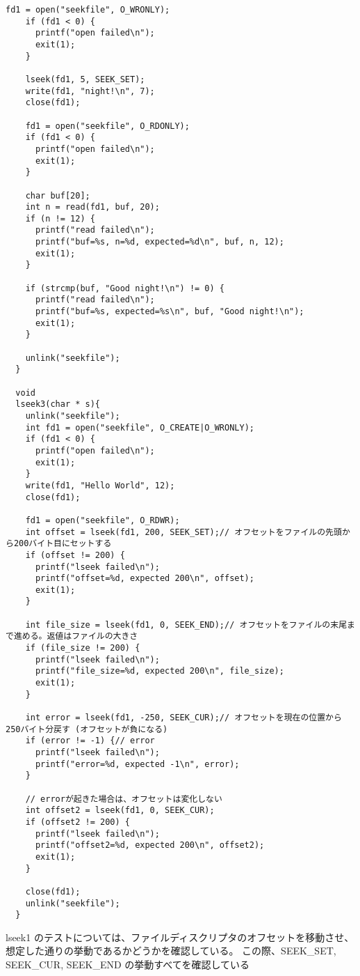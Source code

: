 \documentclass[platex,dvipdfmx, titlepage]{jlreq} %
\begin{document}
\begin{lstlisting}[caption={user/usertests.c}]
    fd1 = open("seekfile", O_WRONLY);
    if (fd1 < 0) {
      printf("open failed\n");
      exit(1);
    }
  
    lseek(fd1, 5, SEEK_SET);
    write(fd1, "night!\n", 7);
    close(fd1);
  
    fd1 = open("seekfile", O_RDONLY);
    if (fd1 < 0) {
      printf("open failed\n");
      exit(1);
    }
  
    char buf[20];
    int n = read(fd1, buf, 20);
    if (n != 12) {
      printf("read failed\n");
      printf("buf=%s, n=%d, expected=%d\n", buf, n, 12);
      exit(1);
    }
  
    if (strcmp(buf, "Good night!\n") != 0) {
      printf("read failed\n");
      printf("buf=%s, expected=%s\n", buf, "Good night!\n");
      exit(1);
    }
  
    unlink("seekfile");
  }
  
  void
  lseek3(char * s){
    unlink("seekfile");
    int fd1 = open("seekfile", O_CREATE|O_WRONLY);
    if (fd1 < 0) {
      printf("open failed\n");
      exit(1);
    }
    write(fd1, "Hello World", 12);
    close(fd1);
  
    fd1 = open("seekfile", O_RDWR);
    int offset = lseek(fd1, 200, SEEK_SET);// オフセットをファイルの先頭から200バイト目にセットする
    if (offset != 200) {
      printf("lseek failed\n");
      printf("offset=%d, expected 200\n", offset);
      exit(1);
    }
  
    int file_size = lseek(fd1, 0, SEEK_END);// オフセットをファイルの末尾まで進める。返値はファイルの大きさ
    if (file_size != 200) {
      printf("lseek failed\n");
      printf("file_size=%d, expected 200\n", file_size);
      exit(1);
    }
  
    int error = lseek(fd1, -250, SEEK_CUR);// オフセットを現在の位置から250バイト分戻す (オフセットが負になる)
    if (error != -1) {// error
      printf("lseek failed\n");
      printf("error=%d, expected -1\n", error);
    }
  
    // errorが起きた場合は、オフセットは変化しない
    int offset2 = lseek(fd1, 0, SEEK_CUR);
    if (offset2 != 200) {
      printf("lseek failed\n");
      printf("offset2=%d, expected 200\n", offset2);
      exit(1);
    }
  
    close(fd1);
    unlink("seekfile");
  }
\end{lstlisting}

lseek1 のテストについては、ファイルディスクリプタのオフセットを移動させ、想定した通りの挙動であるかどうかを確認している。
この際、SEEK\_SET, SEEK\_CUR, SEEK\_END の挙動すべてを確認している
\end{document}
